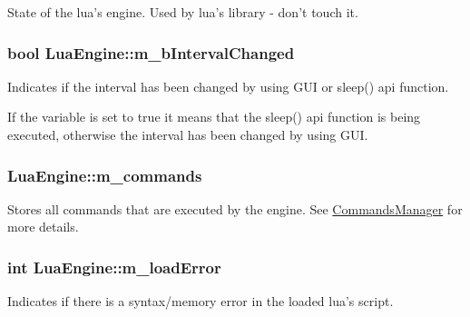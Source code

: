 State of the lua's engine. Used by lua's library -\/ don't touch it. 

\hypertarget{class_lua_engine_add74083d158ee3543d0644c0b6349c5d}{
\subsubsection[{m\-\_\-b\-Interval\-Changed}]{\setlength{\rightskip}{0pt plus 5cm}bool Lua\-Engine\-::m\-\_\-b\-Interval\-Changed\hspace{0.3cm}{\ttfamily [private]}}}\label{class_lua_engine_add74083d158ee3543d0644c0b6349c5d}


Indicates if the interval has been changed by using G\-U\-I or sleep() api function. 

If the variable is set to true it means that the sleep() api function is being executed, otherwise the interval has been changed by using G\-U\-I. \hypertarget{class_lua_engine_a86a3f32127e36e1ccce6c5a42a298ad5}{
\subsubsection[{m\-\_\-commands}]{ Lua\-Engine\-::m\-\_\-commands\hspace{0.3cm}{\ttfamily [private]}}}\label{class_lua_engine_a86a3f32127e36e1ccce6c5a42a298ad5}


Stores all commands that are executed by the engine. See \hyperlink{class_commands_manager}{Commands\-Manager} for more details. 

\hypertarget{class_lua_engine_af8dca74620280060399b5b7dd937af44}{
\subsubsection[{m\-\_\-load\-Error}]{\setlength{\rightskip}{0pt plus 5cm}int Lua\-Engine\-::m\-\_\-load\-Error\hspace{0.3cm}{\ttfamily [private]}}}\label{class_lua_engine_af8dca74620280060399b5b7dd937af44}


Indicates if there is a syntax/memory error in the loaded lua's script. 

